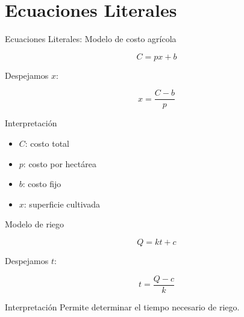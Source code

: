 \documentclass[10pt]{beamer}
\newcommand{\pp}{\pause}
\begin{document}
	\section{Ecuaciones Literales}
	
	\begin{frame}{Ecuaciones Literales: Modelo de costo agrícola}
		
		\[
		C = px + b
		\]
		
		\pp
		
		Despejamos $x$:
		
		\[
		x = \frac{C - b}{p}
		\]
		
		\pp
		
		\begin{block}{Interpretación}
			\begin{itemize}
				\item $C$: costo total
				\item $p$: costo por hectárea
				\item $b$: costo fijo
				\item $x$: superficie cultivada
			\end{itemize}
		\end{block}
		
	\end{frame}
	
	\begin{frame}{Modelo de riego}
		
		\[
		Q = kt + c
		\]
		
		\pp
		
		Despejamos $t$:
		
		\[
		t = \frac{Q - c}{k}
		\]
		
		\pp
		
		\begin{block}{Interpretación}
			Permite determinar el tiempo necesario de riego.
		\end{block}
		
	\end{frame}
	
	
	
	
	
\end{document}
